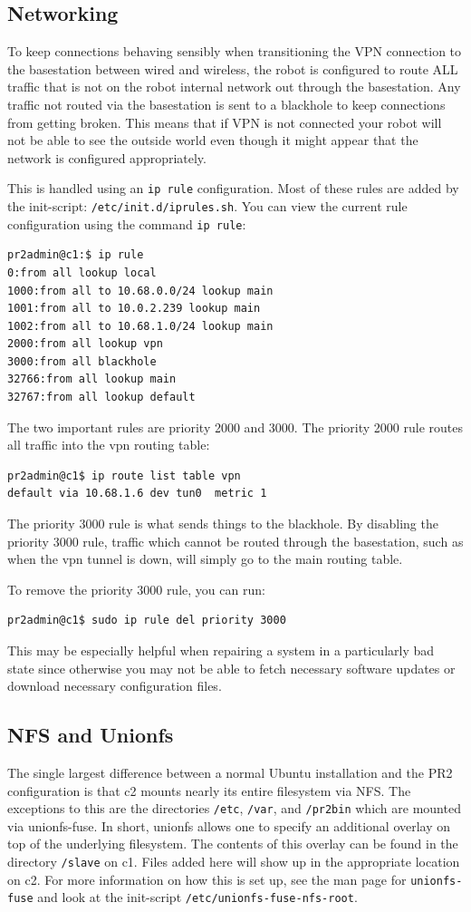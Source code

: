 \subsection{Networking}
To keep connections behaving sensibly when transitioning the VPN
connection to the basestation between wired and wireless, the robot is
configured to route ALL traffic that is not on the robot internal
network out through the basestation.  Any traffic not routed via the
basestation is sent to a blackhole to keep connections from getting
broken.  This means that if VPN is not connected your robot will not
be able to see the outside world even though it might appear that the
network is configured appropriately.

This is handled using an \texttt{ip rule} configuration.  Most of
these rules are added by the init-script:
\texttt{/etc/init.d/iprules.sh}.  You can view the current rule
configuration using the command \texttt{ip rule}:
\begin{verbatim}
pr2admin@c1:$ ip rule
0:from all lookup local 
1000:from all to 10.68.0.0/24 lookup main 
1001:from all to 10.0.2.239 lookup main 
1002:from all to 10.68.1.0/24 lookup main 
2000:from all lookup vpn 
3000:from all blackhole
32766:from all lookup main 
32767:from all lookup default
\end{verbatim}
The two important rules are priority 2000 and 3000.  The priority 2000
rule routes all traffic into the vpn routing table:
\begin{verbatim}
pr2admin@c1$ ip route list table vpn
default via 10.68.1.6 dev tun0  metric 1 
\end{verbatim}
The priority 3000 rule is what sends things to the blackhole.  By
disabling the priority 3000 rule, traffic which cannot be routed
through the basestation, such as when the vpn tunnel is down, will
simply go to the main routing table.

To remove the priority 3000 rule, you can run:
\begin{verbatim}
pr2admin@c1$ sudo ip rule del priority 3000
\end{verbatim}
This may be especially helpful when repairing a system in a
particularly bad state since otherwise you may not be able to fetch
necessary software updates or download necessary configuration files.

\subsection{NFS and Unionfs}
The single largest difference between a normal Ubuntu installation and
the PR2 configuration is that c2 mounts nearly its entire filesystem
via NFS.  The exceptions to this are the directories \texttt{/etc},
\texttt{/var}, and \texttt{/pr2bin} which are mounted via
unionfs-fuse.  In short, unionfs allows one to specify an additional
overlay on top of the underlying filesystem.  The contents of this
overlay can be found in the directory \texttt{/slave} on c1.  Files
added here will show up in the appropriate location on c2.  For more
information on how this is set up, see the man page for
\texttt{unionfs-fuse} and look at the init-script
\texttt{/etc/unionfs-fuse-nfs-root}.

